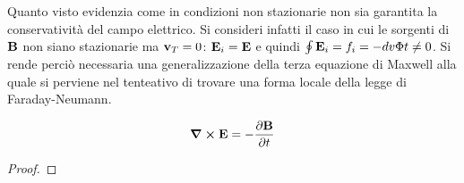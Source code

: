 Quanto visto evidenzia come in condizioni non stazionarie non sia garantita la conservatività del campo elettrico.
Si consideri infatti il caso in cui le sorgenti di $\vb{B}$ non siano stazionarie ma $\vb{v}_T=0$: $\vb{E}_i=\vb{E}$
e quindi $\oint \vb{E}_i=f_i=-dv{\Phi}{t}\neq 0$. Si rende perciò necessaria una generalizzazione della
terza equazione di Maxwell alla quale si perviene nel tenteativo di trovare una forma locale della legge di Faraday-Neumann.
\begin{thm}
    \begin{equation}
        \curl{\vb{E}}=-\pdv{\vb{B}}{t}
    \end{equation}
\end{thm}
\begin{proof}


\end{proof}
